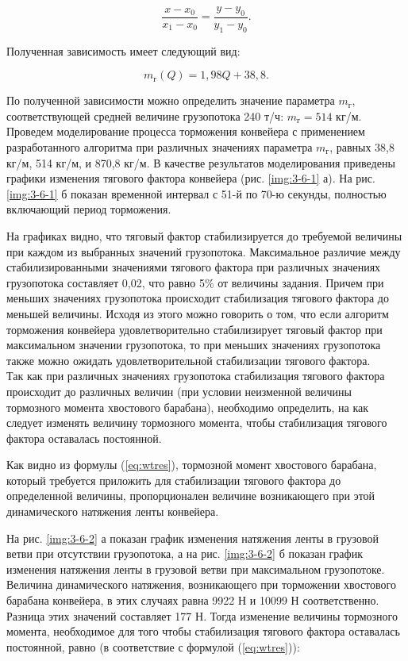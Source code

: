 $$ \frac{x - x_0}{x_1 - x_0} = \frac{y - y_0}{y_1 - y_0}. $$

Полученная зависимость имеет следующий вид:

$$ m_\text{г}(Q) = 1,98Q + 38,8. $$

По полученной зависимости можно определить значение параметра $ m_\text{г} $, соответствующей средней величине грузопотока 240 т/ч: $ m_\text{г} = 514 $ кг/м.\\

Проведем моделирование процесса торможения конвейера с применением разработанного алгоритма при различных значениях параметра $ m_\text{г} $, равных 38,8 кг/м, 514 кг/м, и 870,8 кг/м. В качестве результатов моделирования приведены графики изменения тягового фактора конвейера (рис. \ref{img:3-6-1} а). На рис. \ref{img:3-6-1} б показан временной интервал с 51-й по 70-ю секунды, полностью включающий период торможения.

На графиках видно, что тяговый фактор стабилизируется до требуемой величины при каждом из выбранных значений грузопотока. Максимальное различие между стабилизированными значениями тягового фактора при различных значениях грузопотока составляет 0,02, что равно 5\% от величины задания. Причем при меньших значениях грузопотока происходит стабилизация тягового фактора до меньшей величины. Исходя из этого можно говорить о том, что если алгоритм торможения конвейера удовлетворительно стабилизирует тяговый фактор при максимальном значении грузопотока, то при меньших значениях грузопотока также можно ожидать удовлетворительной стабилизации тягового фактора.\\

Так как при различных значениях грузопотока стабилизация тягового фактора происходит до различных величин (при условии неизменной  величины тормозного момента хвостового барабана), необходимо определить, на как следует изменять величину тормозного момента, чтобы стабилизация тягового фактора оставалась постоянной. 

Как видно из формулы (\ref{eq:wtres}), тормозной момент хвостового барабана, который требуется приложить для стабилизации тягового фактора до определенной величины, пропорционален величине возникающего при этой динамического натяжения ленты конвейера. 

На рис. \ref{img:3-6-2} а показан график изменения натяжения ленты в грузовой ветви при отсутствии грузопотока, а на рис. \ref{img:3-6-2} б показан график изменения натяжения ленты в грузовой ветви при максимальном грузопотоке. Величина динамического натяжения, возникающего при торможении хвостового барабана конвейера, в этих случаях равна 9922 Н и 10099 Н соответственно. Разница этих значений составляет 177 Н. Тогда изменение величины тормозного момента, необходимое для того чтобы стабилизация тягового фактора оставалась постоянной, равно (в соответствие с формулой (\ref{eq:wtres})):

